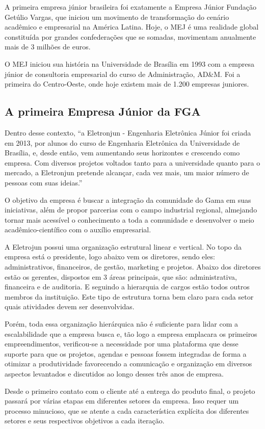 A primeira empresa júnior brasileira foi exatamente a Empresa Júnior Fundação Getúlio Vargas, que iniciou um movimento de transformação do cenário acadêmico e empresarial na América Latina. Hoje, o MEJ é uma realidade global constituída por grandes confederações que se somadas, movimentam anualmente mais de 3 milhões de euros.

O MEJ iniciou sua história na Universidade de Brasília em 1993 com a empresa júnior de consultoria empresarial do curso de Administração, AD\&M. Foi a primeira do Centro-Oeste, onde hoje existem mais de 1.200 empresas juniores.

\subsection{A primeira Empresa Júnior da FGA}
Dentro desse contexto, “a Eletronjun - Engenharia Eletrônica Júnior foi criada em 2013, por alunos do curso de Engenharia Eletrônica da Universidade de Brasília, e, desde então, vem aumentando seus horizontes e crescendo como empresa. Com diversos projetos voltados tanto para a universidade quanto para o mercado, a Eletronjun pretende alcançar, cada vez mais, um maior número de pessoas com suas ideias.”

O objetivo da empresa é buscar a integração da comunidade do Gama em suas iniciativas, além de propor parcerias com o campo industrial regional, almejando tornar mais acessível o conhecimento a toda a comunidade e desenvolver o meio acadêmico-científico com o auxílio empresarial.
    
A Eletrojun possui uma organização estrutural linear e vertical. No topo da empresa está o presidente, logo abaixo vem os diretores, sendo eles: administrativos, financeiros, de gestão, marketing e projetos. Abaixo dos diretores estão os gerentes, dispostos em 3 áreas principais, que são: administrativa, financeira e de auditoria. E seguindo a hierarquia de cargos estão todos outros membros da instituição. Este tipo de estrutura torna bem claro para cada setor quais atividades devem ser desenvolvidas.

Porém, toda essa organização hierárquica não é suficiente para lidar com a escalabilidade que a empresa busca e, tão logo a empresa emplacara os primeiros empreendimentos, verificou-se a necessidade por uma plataforma que desse suporte para que os projetos, agendas e pessoas fossem integradas de forma a otimizar a produtividade favorecendo a comunicação e organização em diversos aspectos levantados e discutidos ao longo desses três anos de empresa.

Desde o primeiro contato com o cliente até a entrega do produto final, o projeto passará por várias etapas em diferentes setores da empresa. Isso requer um processo minucioso, que se atente a cada característica explícita dos diferentes setores e seus respectivos objetivos a cada iteração.
